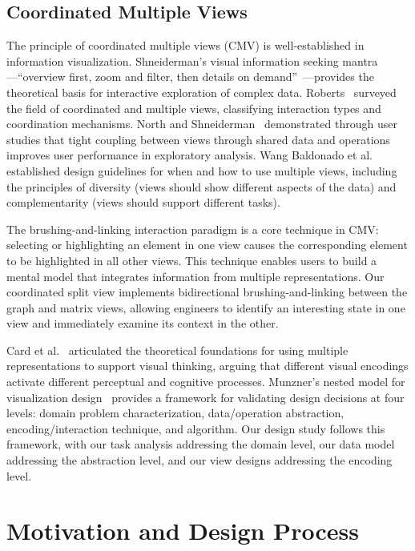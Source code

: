 \documentclass[conference]{IEEEtran}
\begin{document}
\subsection{Coordinated Multiple Views}

The principle of coordinated multiple views (CMV) is well-established in information visualization. Shneiderman's visual information seeking mantra---``overview first, zoom and filter, then details on demand''~\cite{shneiderman1996eyes}---provides the theoretical basis for interactive exploration of complex data. Roberts~\cite{roberts2007cmv} surveyed the field of coordinated and multiple views, classifying interaction types and coordination mechanisms. North and Shneiderman~\cite{north2000snap} demonstrated through user studies that tight coupling between views through shared data and operations improves user performance in exploratory analysis. Wang Baldonado et al.~\cite{baldonado2000guidelines} established design guidelines for when and how to use multiple views, including the principles of diversity (views should show different aspects of the data) and complementarity (views should support different tasks).

The brushing-and-linking interaction paradigm is a core technique in CMV: selecting or highlighting an element in one view causes the corresponding element to be highlighted in all other views. This technique enables users to build a mental model that integrates information from multiple representations. Our coordinated split view implements bidirectional brushing-and-linking between the graph and matrix views, allowing engineers to identify an interesting state in one view and immediately examine its context in the other.

Card et al.~\cite{card1999readings} articulated the theoretical foundations for using multiple representations to support visual thinking, arguing that different visual encodings activate different perceptual and cognitive processes. Munzner's nested model for visualization design~\cite{munzner2009nested} provides a framework for validating design decisions at four levels: domain problem characterization, data/operation abstraction, encoding/interaction technique, and algorithm. Our design study follows this framework, with our task analysis addressing the domain level, our data model addressing the abstraction level, and our view designs addressing the encoding level.

\section{Motivation and Design Process}
\label{sec:design}
\end{document}
